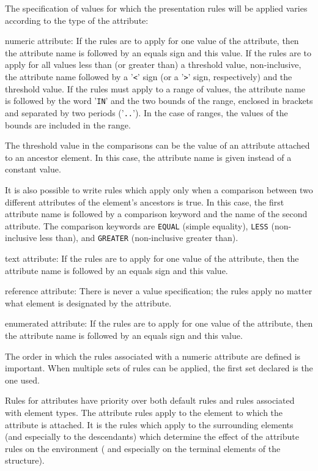 The specification of values for which the presentation rules will be
applied varies according to the type of the attribute:
\begin{description}
\item{numeric attribute:} If the rules are to apply for one value of
the attribute, then the attribute name is followed by an equals sign
and this value.  If the rules are to apply for all values less than
(or greater than) a threshold value, non-inclusive, the attribute name
followed by a '\verb|<|' sign (or a '\verb|>|' sign, respectively) and
the threshold value.  If the rules must apply to a range of values,
the attribute name is followed by the word '{\tt IN}' and the two
bounds of the range, enclosed in brackets and separated by two periods
('{\tt ..}').  In the case of ranges, the values of the bounds are
included in the range.

The threshold value in the comparisons can be the value of an
attribute attached to an ancestor element.  In this case, the
attribute name is given instead of a constant value.

It is also possible to write rules which apply only when a comparison
between two different attributes of the element's ancestors is true.
In this case, the first attribute name is followed by a comparison
keyword and the name of the second attribute.  The comparison keywords
are {\tt EQUAL} (simple equality), {\tt LESS} (non-inclusive less
than), and {\tt GREATER} (non-inclusive greater than).

\item{text attribute:}  If the rules are to apply for one value of
the attribute, then the attribute name is followed by an equals sign
and this value.

\item{reference attribute:}  There is never a value specification; the
rules apply no matter what element is designated by the attribute.

\item{enumerated attribute:}  If the rules are to apply for one value of
the attribute, then the attribute name is followed by an equals sign
and this value.

\end{description}

The order in which the rules associated with a numeric attribute are
defined is important.  When multiple sets of rules can be applied, the
first set declared is the one used.

Rules for attributes have priority over both default rules and rules
associated with element types.  The attribute rules apply to the
element to which the attribute is attached.  It is the rules which
apply to the surrounding elements (and especially to the descendants)
which determine the effect of the attribute rules on the environment (
and especially on the terminal elements of the structure).

